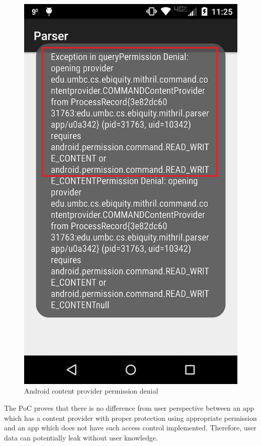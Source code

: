 \begin{figure}[tb]
\centering
	\includegraphics[scale=0.18]{images/didNotRequestPermission}
	\caption{Android content provider permission denial}
	\label{fig:didNotRequestPermission}
\end{figure}

The PoC proves that there is no difference from user perspective between an app which has a content provider with proper protection using appropriate permission and an app which does not have such access control implemented. Therefore, user data can potentially leak without user knowledge.

